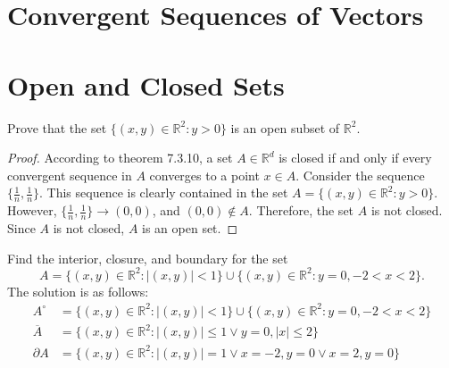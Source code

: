 \documentclass[12pt]{book}
\newcommand{\R}{\mathbb{R}}
\newenvironment{exercise}[2][Exercise]{\begin{trivlist}
\item[\hskip \labelsep {\bfseries #1}\hskip \labelsep {\bfseries #2.}]}{\end{trivlist}}
\begin{document}
\section{Convergent Sequences of Vectors}





\section{Open and Closed Sets}


\begin{exercise}{7.3.1}
Prove that the set $\{(x, y) \in \R^2 : y > 0\}$ is an open subset of $\R^2$. 

    \begin{proof}
    According to theorem 7.3.10, a set $A\in \R^d$ is closed if and only if every convergent sequence in $A$ converges to a point $x \in A$. Consider the sequence $\{\frac{1}{n}, \frac{1}{n} \}$. This sequence is clearly contained in the set $A = \{(x, y) \in \R^2 : y > 0\}$. However, $\{\frac{1}{n}, \frac{1}{n} \} \to (0,0)$, and $(0,0) \notin A$. Therefore, the set $A$ is not closed. Since $A$ is not closed, $A$ is an open set.
    \end{proof}
\end{exercise}


\begin{exercise}{7.3.4}
Find the interior, closure, and boundary for the set 
\[ A= \{(x, y) \in \R^2 : |(x, y)| < 1\} \cup \{(x, y) \in \R^2 : y = 0, −2 < x < 2\}. \]
The solution is as follows:
    \begin{align*}
    A^\circ &= \{(x, y) \in \R^2 : |(x, y)| < 1\} \cup \{(x, y) \in \R^2 : y = 0, −2 < x < 2\}\\
    \overline{A} &= \{ (x,y) \in \R^2 : |(x,y)| \leq 1 \lor y=0, |x| \leq 2 \} \\
    \partial A &= \{ (x,y) \in \R^2: |(x,y)| = 1 \lor x=-2, y=0  \lor  x=2, y=0  \}
    \end{align*}
\end{exercise}
\end{document}

